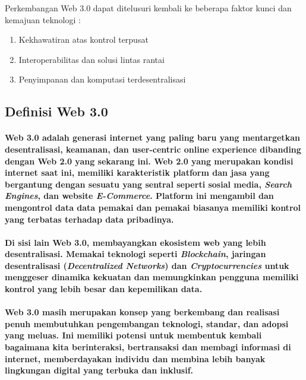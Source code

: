 \documentclass[a4paper]{article}
\begin{document}
Perkembangan Web 3.0 dapat ditelusuri kembali ke beberapa faktor kunci dan
kemajuan teknologi :

\begin{enumerate}
      \item {
            Kekhawatiran atas kontrol terpusat
            }

      \item {
            Interoperabilitas dan solusi lintas rantai
            }

      \item {
            Penyimpanan dan komputasi terdesentralisasi
            }
\end{enumerate}

\subsection{Definisi Web 3.0}

\normalcolor

\paragraph{
      \normalfont
      Web 3.0 adalah generasi internet yang paling baru yang mentargetkan
      desentralisasi, keamanan, dan user-centric online experience dibanding
      dengan Web 2.0 yang sekarang ini. Web 2.0 yang merupakan kondisi internet
      saat ini, memiliki karakteristik platform dan jasa yang bergantung dengan
      sesuatu yang sentral seperti sosial media, \textit{Search Engines}, dan
      website \textit{E-Commerce}. Platform ini mengambil dan mengontrol data
      data pemakai dan pemakai biasanya memiliki kontrol yang terbatas terhadap
      data pribadinya.
}

\paragraph{
      \normalfont
      Di sisi lain Web 3.0, membayangkan ekosistem web yang lebih
      desentralisasi. Memakai teknologi seperti \textit{Blockchain}, jaringan
      desentralisasi (\textit{Decentralized Networks}) dan
      \textit{Cryptocurrencies} untuk menggeser dinamika kekuatan dan
      memungkinkan pengguna memiliki kontrol yang lebih besar dan kepemilikan
      data.
}

\paragraph{
      \normalfont
      Web 3.0 masih merupakan konsep yang berkembang dan realisasi penuh
      membutuhkan pengembangan teknologi, standar, dan adopsi yang meluas. Ini
      memiliki potensi untuk membentuk kembali bagaimana kita berinteraksi,
      bertransaksi dan membagi informasi di internet, memberdayakan individu dan
      membina lebih banyak lingkungan digital yang terbuka dan inklusif.
}
\end{document}
